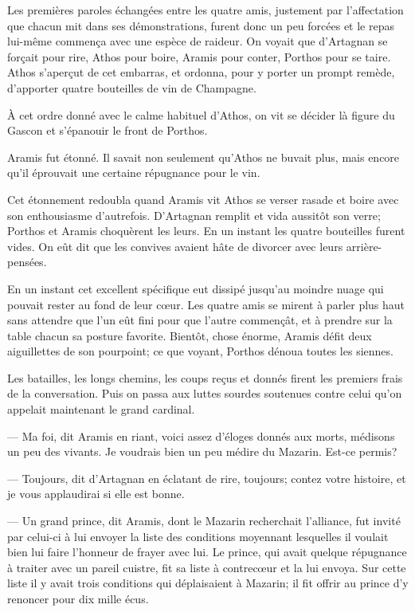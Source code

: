 Les premières paroles échangées entre les quatre amis, justement par l'affectation que chacun mit dans ses démonstrations, furent donc un peu forcées et le repas lui-même commença avec une espèce de raideur. On voyait que d'Artagnan se forçait pour rire, Athos pour boire, Aramis pour conter, Porthos pour se taire. Athos s'aperçut de cet embarras, et ordonna, pour y porter un prompt remède, d'apporter quatre bouteilles de vin de Champagne.

À cet ordre donné avec le calme habituel d'Athos, on vit se décider là figure du Gascon et s'épanouir le front de Porthos.

Aramis fut étonné. Il savait non seulement qu'Athos ne buvait plus, mais encore qu'il éprouvait une certaine répugnance pour le vin.

Cet étonnement redoubla quand Aramis vit Athos se verser rasade et boire avec son enthousiasme d'autrefois. D'Artagnan remplit et vida aussitôt son verre; Porthos et Aramis choquèrent les leurs. En un instant les quatre bouteilles furent vides. On eût dit que les convives avaient hâte de divorcer avec leurs arrière-pensées.

En un instant cet excellent spécifique eut dissipé jusqu'au moindre nuage qui pouvait rester au fond de leur cœur. Les quatre amis se mirent à parler plus haut sans attendre que l'un eût fini pour que l'autre commençât, et à prendre sur la table chacun sa posture favorite. Bientôt, chose énorme, Aramis défit deux aiguillettes de son pourpoint; ce que voyant, Porthos dénoua toutes les siennes.

Les batailles, les longs chemins, les coups reçus et donnés firent les premiers frais de la conversation. Puis on passa aux luttes sourdes soutenues contre celui qu'on appelait maintenant le grand cardinal.

— Ma foi, dit Aramis en riant, voici assez d'éloges donnés aux morts, médisons un peu des vivants. Je voudrais bien un peu médire du Mazarin. Est-ce permis?

— Toujours, dit d'Artagnan en éclatant de rire, toujours; contez votre histoire, et je vous applaudirai si elle est bonne.

— Un grand prince, dit Aramis, dont le Mazarin recherchait l'alliance, fut invité par celui-ci à lui envoyer la liste des conditions moyennant lesquelles il voulait bien lui faire l'honneur de frayer avec lui. Le prince, qui avait quelque répugnance à traiter avec un pareil cuistre, fit sa liste à contrecœur et la lui envoya. Sur cette liste il y avait trois conditions qui déplaisaient à Mazarin; il fit offrir au prince d'y renoncer pour dix mille écus.


